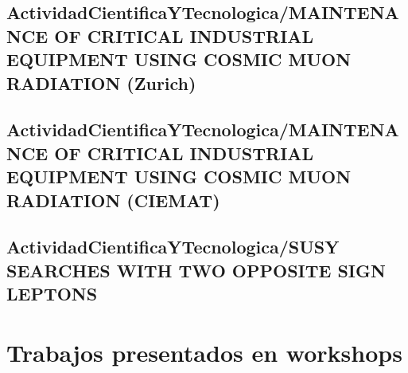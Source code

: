 \documentclass[a4paper, 11pt, twoside, openright]{report}
\begin{document}
\subsection{ActividadCientificaYTecnologica/MAINTENANCE OF CRITICAL INDUSTRIAL EQUIPMENT USING COSMIC MUON RADIATION (Zurich)}


\subsection{ActividadCientificaYTecnologica/MAINTENANCE OF CRITICAL INDUSTRIAL EQUIPMENT USING COSMIC MUON RADIATION (CIEMAT)}


\subsection{ActividadCientificaYTecnologica/SUSY SEARCHES WITH TWO OPPOSITE SIGN LEPTONS}


\section{Trabajos presentados en workshops}

%

%

%
\end{document}

